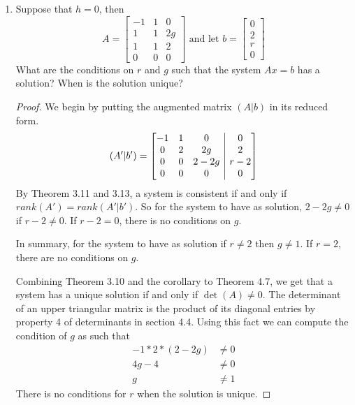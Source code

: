 \documentclass[11pt]{scrartcl}
\begin{document}
\begin{enumerate}[label=\alph*.]
	\item{
	      Suppose that $h = 0$, then
	      $$A =
		      \begin{bmatrix}
			      -1 & 1 & 0  \\
			      1  & 1 & 2g \\
			      1  & 1 & 2  \\
			      0  & 0 & 0
		      \end{bmatrix}
		      \text{ and let }
		      b =
		      \begin{bmatrix}
			      0 \\
			      2 \\
			      r \\
			      0
		      \end{bmatrix}
	      $$
	      What are the conditions on $r$ and $g$ such that the system $Ax = b$ has a solution? When
	      is the solution unique?
	      \begin{proof}
		      We begin by putting the augmented matrix $(A|b)$ in its reduced form.
		      $$(A'|b') = \left[\begin{array}{@{}ccc|c@{}}-1&1&0&0\\ 0&2&2g&2\\ 0&0&2-2g&r-2\\ 0&0&0&0\end{array}\right]$$
		      By Theorem 3.11 and 3.13, a system is consistent if and only if $rank (A') = rank (A'|b') .$
		      So for the system to have as solution, $2 - 2g \neq 0$ if $r - 2 \neq 0$.	If $r - 2 = 0$, there is no conditions
		      on $g$.\par
		      In summary, for the system to have as solution if $r \neq 2$ then $g \neq 1$. If $r = 2$, there are no conditions
		      on $g$.\par
		      Combining Theorem 3.10 and the corollary to Theorem 4.7, we get that a system has a
		      unique solution if and only if $\det(A) \neq 0$.
		      The determinant of an upper triangular matrix is the product of its diagonal
		      entries by property 4 of determinants in section 4.4.
		      Using this fact we can compute the condition of $g$ as such that
		      \begin{align*}
			      -1*2*(2-2g) & \neq 0 \\
			      4g -4       & \neq 0 \\
			      g           & \neq 1
		      \end{align*}
		      There is no conditions for $r$ when the solution is unique.
	      \end{proof}
}
\end{enumerate}
\end{document}
